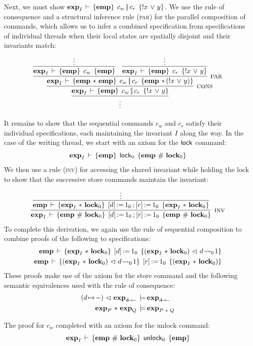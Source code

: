 \documentclass[11pt]{report}
\begin{document}
Next, we must show $\mathbf{exp}_{I}\,\vdash\,\left\lbrace \mathbf{emp} \right\rbrace\;c_w \operatorname{|\!|} c_r\;\left\lbrace !x \operatorname{\,\vee\,} y \right\rbrace$. We use the rule of consequence and a structural inference rule (\textsc{par}) for the parallel composition of commands, which allows us to infer a combined specification from specifications of individual threads when their local states are spatially disjoint and their invariants match: \[ \infer{\vdots}{\infer[\textsc{cons}]{\spec{\fexp{I}}{\femp}{c_w \oppar c_r}{!x \disj y}}{\infer[\textsc{par}]{\spec{\fexp{I}}{\femp \fsep \femp}{c_w \oppar c_r}{\femp \fsep (!x \disj y)}}{\infer{\spec{\fexp{I}}{\femp}{c_w}{\femp}}{\vdots} & \infer{\spec{\fexp{I}}{\femp}{c_r}{!x \disj y}}{\vdots}}}}\]   

It remains to show that the sequential commands $c_w$ and $c_r$ satisfy their individual specifications, each maintaining the invariant $I$ along the way. In the case of the writing thread, we start with an axiom for the $\operatorname{\mathsf{lock}}$ command: \[ \mathbf{exp}_{I}\,\vdash\,\left\lbrace \mathbf{emp} \right\rbrace\;\operatorname{\mathsf{lock}}_0\;\left\lbrace \mathbf{emp} \operatorname{\,\#\,} \mathbf{lock}_{0} \right\rbrace\] We then use a rule (\textsc{inv}) for accessing the shared invariant while holding the lock to show that the successive store commands maintain the invariant: \[ \infer[\textsc{inv}]{\spec{\fexp{I}}{\femp \fhash \flock{0}}{\cstore{d}{1}_0 \opseq \cstore{r}{1}_0}{\femp \fhash \flock{0}}}{\infer{\spec{\femp}{\fexp{I} \fsep \flock{0}}{\cstore{d}{1}_0 \opseq \cstore{r}{1}_0}{\fexp{I} \fsep \flock{0}}}{\vdots}}\] To complete this derivation, we again use the rule of sequential composition to combine proofs of the following to specifications: \begin{align*}
\mathbf{emp}\,\vdash\,\left\lbrace \mathbf{exp}_{I} \operatorname{\,\ast\,} \mathbf{lock}_{0} \right\rbrace\;\left[ d \right] \operatorname{:\!=} 1_0\;\left\lbrace (\mathbf{exp}_{I} \operatorname{\,\ast\,} \mathbf{lock}_{0}) \operatorname{\,\vartriangleleft\,} d \!\leadsto_{0}\! 1 \right\rbrace \\ 
\mathbf{emp}\,\vdash\,\left\lbrace (\mathbf{exp}_{I} \operatorname{\,\ast\,} \mathbf{lock}_{0}) \operatorname{\,\vartriangleleft\,} d \!\leadsto_{0}\! 1 \right\rbrace\;\left[ r \right] \operatorname{:\!=} 1_0\;\left\lbrace (\mathbf{exp}_{I} \operatorname{\,\ast\,} \mathbf{lock}_{0}) \right\rbrace \\ 
\end{align*} These proofs make use of the axiom for the store command and the following semantic equivalences used with the rule of consequence: \begin{align*}
  (d \!\mapsto\! -) \operatorname{\,\vartriangleleft\,} \mathbf{exp}_{d \!\mapsto\! -} \,\models\, &\mathbf{exp}_{d \!\mapsto\! -
  } \\
  \mathbf{exp}_{P} \operatorname{\,\ast\,} \mathbf{exp}_{Q} \,\models\, & \mathbf{exp}_{P \operatorname{\,\ast\,} Q} 
  \end{align*}

The proof for $c_w$ completed with an axiom for the unlock command: \[ \mathbf{exp}_{I}\,\vdash\,\left\lbrace \mathbf{emp} \operatorname{\,\#\,} \mathbf{lock}_{0} \right\rbrace\;\operatorname{\mathsf{unlock}}_0\;\left\lbrace \mathbf{emp} \right\rbrace \]
\end{document}

